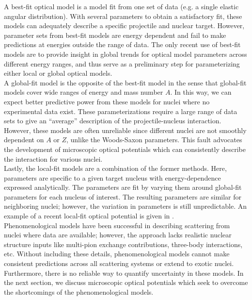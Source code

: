 \documentclass[preprintnumbers,floatfix,aps,prc,preprint,nofootinbib]{revtex4-1}
\begin{document}
A best-fit optical model is a model fit from one set of data (e.g. a single elastic angular distribution). With several parameters to obtain a satisfactory fit, these models can adequately describe a specific projectile and nuclear target. However, parameter sets from best-fit models are energy dependent and fail to make predictions at energies outside the range of data. The only recent use of best-fit models are to provide insight in global trends for optical model parameters across different energy ranges, and thus serve as a preliminary step for parameterizing either local or global optical models.
\\

A global-fit model is the opposite of the best-fit model in the sense that global-fit models cover wide ranges of energy and mass number $A$. In this way, we can expect better predictive power from these models for nuclei where no experimental data exist. These parameterizations require a large range of data sets to give an ``average'' description of the projectile-nucleus interaction. However, these models are often unreliable since different nuclei are not smoothly dependent on $A$ or $Z$, unlike the Woods-Saxon parameters. This fault advocates the development of microscopic optical potentials which can consistently describe the interaction for various nuclei.
\\

Lastly, the local-fit models are a combination of the former methods. Here, parameters are specific to a given target nucleus with energy-dependence expressed analytically. The parameters are fit by varying them around global-fit parameters for each nucleus of interest. The resulting parameters are similar for neighboring nuclei; however, the variation in parameters is still unpredictable. An example of a recent local-fit optical potential is given in \cite{Koning:2003zz}.
\\

Phenomenological models have been successful in describing scattering from nuclei where data are available; however, the approach lacks realistic nuclear structure inputs like multi-pion exchange contributions, three-body interactions, etc. Without including these details, phenomenological models cannot make consistent predictions across all scattering systems or extend to exotic nuclei. Furthermore, there is no reliable way to quantify uncertainty in these models. In the next section, we discuss microscopic optical potentials which seek to overcome the shortcomings of the phenomenological models.
\end{document}
